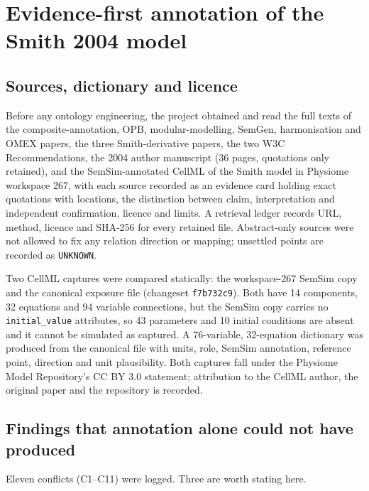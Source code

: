 \documentclass[11pt,letterpaper]{article}
\newcommand{\pkg}[1]{\texttt{#1}}
\begin{document}
\section{Evidence-first annotation of the Smith 2004 model}
\label{sec:evidence}

\subsection{Sources, dictionary and licence}

Before any ontology engineering, the project obtained and read the full texts of the composite-annotation, OPB, modular-modelling, SemGen, harmonisation and OMEX papers, the three Smith-derivative papers, the two W3C Recommendations, the 2004 author manuscript (36 pages, quotations only retained), and the SemSim-annotated CellML of the Smith model in Physiome workspace 267, with each source recorded as an evidence card holding exact quotations with locations, the distinction between claim, interpretation and independent confirmation, licence and limits. A retrieval ledger records URL, method, licence and SHA-256 for every retained file. Abstract-only sources were not allowed to fix any relation direction or mapping; unsettled points are recorded as \texttt{UNKNOWN}.

Two CellML captures were compared statically: the workspace-267 SemSim copy and the canonical exposure file (changeset \texttt{f7b732c9}). Both have 14 components, 32 equations and 94 variable connections, but the SemSim copy carries no \pkg{initial\_value} attributes, so 43 parameters and 10 initial conditions are absent and it cannot be simulated as captured. A 76-variable, 32-equation dictionary was produced from the canonical file with units, role, SemSim annotation, reference point, direction and unit plausibility. Both captures fall under the Physiome Model Repository's CC BY 3.0 statement; attribution to the CellML author, the original paper and the repository is recorded.

\subsection{Findings that annotation alone could not have produced}
\label{sec:conflicts}

Eleven conflicts (C1--C11) were logged. Three are worth stating here.
\end{document}
